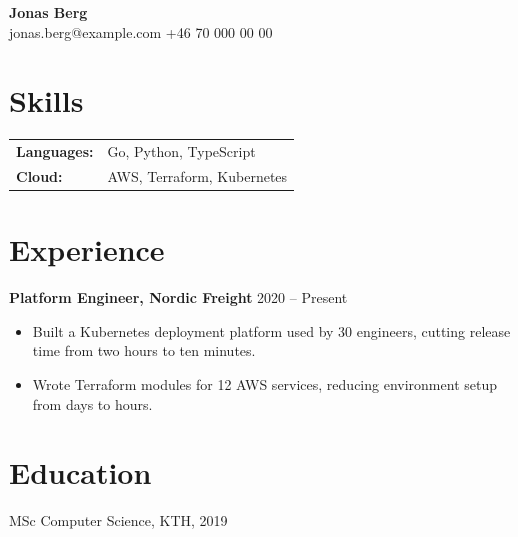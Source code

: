 \documentclass[11pt]{article}
\begin{document}
\begin{center}{\Large \textbf{Jonas Berg}} \\ jonas.berg@example.com \quad +46 70 000 00 00\end{center}
\section*{Skills}
\begin{tabular}{ll}
\textbf{Languages:} & Go, Python, TypeScript \\
\textbf{Cloud:} & AWS, Terraform, Kubernetes \\
\end{tabular}
\section*{Experience}
\textbf{Platform Engineer, Nordic Freight} \hfill 2020 -- Present
\begin{itemize}
\item Built a Kubernetes deployment platform used by 30 engineers, cutting release time from two hours to ten minutes.
\item Wrote Terraform modules for 12 AWS services, reducing environment setup from days to hours.
\end{itemize}
\section*{Education}
MSc Computer Science, KTH, 2019
\end{document}
